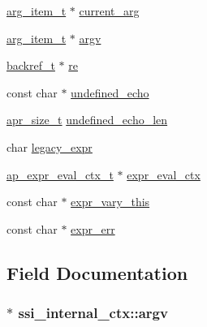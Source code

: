 \begin{DoxyCompactItemize}
\item 
\hyperlink{mod__include_8c_a24faea701a438c77c93c773a6605dd7d}{arg\+\_\+item\+\_\+t} $\ast$ \hyperlink{structssi__internal__ctx_afc2fbebc36aaf79336623a86f09b8c42}{current\+\_\+arg}
\item 
\hyperlink{mod__include_8c_a24faea701a438c77c93c773a6605dd7d}{arg\+\_\+item\+\_\+t} $\ast$ \hyperlink{structssi__internal__ctx_abdee4a071d62a7be33087fd303a335de}{argv}
\item 
\hyperlink{structbackref__t}{backref\+\_\+t} $\ast$ \hyperlink{structssi__internal__ctx_ac351bc4cf1a03cb62f062c35f343d60e}{re}
\item 
const char $\ast$ \hyperlink{structssi__internal__ctx_ae863f69a7cdee939d87b5a3fbb58cc19}{undefined\+\_\+echo}
\item 
\hyperlink{group__apr__platform_gaaa72b2253f6f3032cefea5712a27540e}{apr\+\_\+size\+\_\+t} \hyperlink{structssi__internal__ctx_aeac0930b053a13bb3bb740ff316f1cd5}{undefined\+\_\+echo\+\_\+len}
\item 
char \hyperlink{structssi__internal__ctx_ade90207d076c2accb3610da41ce5fd01}{legacy\+\_\+expr}
\item 
\hyperlink{structap__expr__eval__ctx__t}{ap\+\_\+expr\+\_\+eval\+\_\+ctx\+\_\+t} $\ast$ \hyperlink{structssi__internal__ctx_ae96d95bfd264ae501fc608c900f67c98}{expr\+\_\+eval\+\_\+ctx}
\item 
const char $\ast$ \hyperlink{structssi__internal__ctx_aba15079ce667e353f4a4bf54c0fa172a}{expr\+\_\+vary\+\_\+this}
\item 
const char $\ast$ \hyperlink{structssi__internal__ctx_a1dced60e1bddeb7bdcf0056b6d10567a}{expr\+\_\+err}
\end{DoxyCompactItemize}


\subsection{Field Documentation}
\subsubsection[{\texorpdfstring{argv}{argv}}]{$\ast$ ssi\+\_\+internal\+\_\+ctx\+::argv}\hypertarget{structssi__internal__ctx_abdee4a071d62a7be33087fd303a335de}{}\label{structssi__internal__ctx_abdee4a071d62a7be33087fd303a335de}

